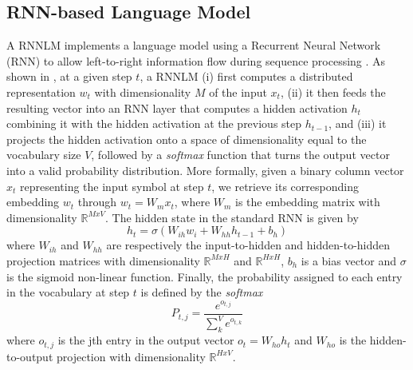 \documentclass[11pt]{article}
\begin{document}
\subsection{RNN-based Language Model}\label{sec:rnn}
A RNNLM implements a language model using a Recurrent Neural Network (RNN) to
allow left-to-right information flow during sequence processing \cite{Mikolov2010}.
As shown in \cite{Bengio2003},
at a given step $t$, a RNNLM \cite{Elman1990} (i) first computes a distributed
representation $w_t$ with dimensionality $M$ of the input $x_t$,
(ii) it then feeds the resulting vector into an RNN layer that computes a hidden activation
$h_t$ combining it with the hidden activation at the previous step $h_{t-1}$, 
and (iii) it projects
the hidden activation onto a space of dimensionality equal to the vocabulary size $V$, 
followed by a \emph{softmax} function that turns the output vector
into a valid probability distribution. More formally, given a binary column vector $x_t$ representing the input symbol at step
$t$, we retrieve its corresponding embedding $w_t$ through $w_t = W_mx_t$, where $W_m$ is the embedding matrix with dimensionality $\mathbb{R}^{M x V}$. The hidden state in the standard RNN is given by
\begin{equation}
h_t = \sigma(W_{ih} w_i + W_{hh} h_{t-1} + b_h)
\end{equation}
\noindent where $W_{ih}$ and $W_{hh}$ are respectively the input-to-hidden and hidden-to-hidden 
projection matrices with dimensionality $\mathbb{R}^{M x H}$ and $\mathbb{R}^{H x H}$,
$b_h$ is a bias vector and $\sigma$ is the sigmoid non-linear function.
Finally, the probability assigned to each entry in the vocabulary at step $t$ is defined by the \emph{softmax}
\begin{equation}
P_{t,j} = \frac{e^{o_{t,j}}}{\sum_k^V e^{o_{t,k}}}
\end{equation}
where $o_{t,j}$ is the jth entry in the output vector $o_t = W_{ho}h_t$
and $W_{ho}$ is the hidden-to-output projection with dimensionality $\mathbb{R}^{HxV}$.
\end{document}

